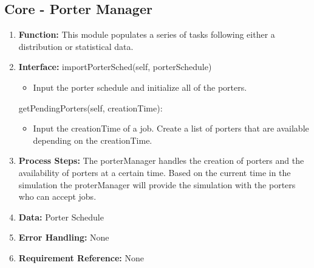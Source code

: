 \documentclass[paper=letter, fontsize=10pt]{scrartcl}
\numberwithin{equation}{section}		%
\numberwithin{figure}{section}			%
\numberwithin{table}{section}				%
\begin{document}
\subsection{Core - Porter Manager}
\begin{enumerate}[]
	\item \textbf{Function:} This module populates a series of tasks following either a distribution or statistical data.
	\item \textbf{Interface:} \newline
		importPorterSched(self, porterSchedule)
		\begin{itemize}
			\item Input the porter schedule and initialize all of the porters.
		\end{itemize}
		getPendingPorters(self, creationTime):
		\begin{itemize}
			\item Input the creationTime of a job.  Create a list of porters that  are available depending on the creationTime.  
		\end{itemize}
		
	\item \textbf{Process Steps:} The porterManager handles the creation of porters and the availability of porters at a certain time.  Based on the current time in the simulation the proterManager will provide the simulation with the porters who can accept jobs.
	
	\item \textbf{Data:} Porter Schedule
	\item \textbf{Error Handling:} None
	\item \textbf{Requirement Reference:} None
\end{enumerate}
\end{document}
